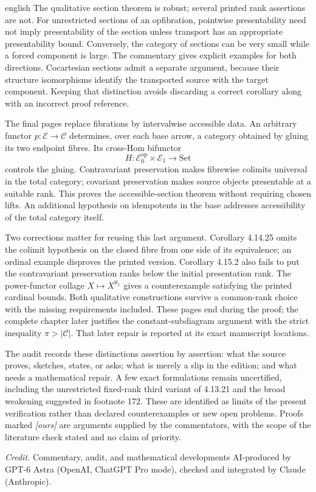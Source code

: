 \begin{otherlanguage*}{english}
The qualitative section theorem is robust; several printed rank assertions are not. For unrestricted sections of an opfibration, pointwise presentability need not imply presentability of the section unless transport has an appropriate presentability bound. Conversely, the category of sections can be very small while a forced component is large. The commentary gives explicit examples for both directions. Cocartesian sections admit a separate argument, because their structure isomorphisms identify the transported source with the target component. Keeping that distinction avoids discarding a correct corollary along with an incorrect proof reference.

The final pages replace fibrations by intervalwise accessible data. An arbitrary functor $p:\mathcal E\to\mathcal C$ determines, over each base arrow, a category obtained by gluing its two endpoint fibres. Its cross-Hom bifunctor
\[
 H:\mathcal E_0^{\mathrm{op}}\times\mathcal E_1\to\mathrm{Set}
\]
controls the gluing. Contravariant preservation makes fibrewise colimits universal in the total category; covariant preservation makes source objects presentable at a suitable rank. This proves the accessible-section theorem without requiring chosen lifts. An additional hypothesis on idempotents in the base addresses accessibility of the total category itself.

Two corrections matter for reusing this last argument. Corollary 4.14.25 omits the colimit hypothesis on the closed fibre from one side of its equivalence; an ordinal example disproves the printed version. Corollary 4.15.2 also fails to put the contravariant preservation ranks below the initial presentation rank. The power-functor collage $X\mapsto X^{\aleph_1}$ gives a counterexample satisfying the printed cardinal bounds. Both qualitative constructions survive a common-rank choice with the missing requirements included. These pages end during the proof; the complete chapter later justifies the constant-subdiagram argument with the strict inequality $\pi>|\mathcal C|$. That later repair is reported at its exact manuscript locations.

The audit records these distinctions assertion by assertion: what the source proves, sketches, states, or asks; what is merely a slip in the edition; and what needs a mathematical repair. A few exact formulations remain uncertified, including the unrestricted fixed-rank third variant of 4.13.21 and the broad weakening suggested in footnote 172. These are identified as limits of the present verification rather than declared counterexamples or new open problems. Proofs marked \emph{[ours]} are arguments supplied by the commentators, with the scope of the literature check stated and no claim of priority.

\medskip
\noindent\textit{Credit.} Commentary, audit, and mathematical developments AI-produced by GPT-6 Astra (OpenAI, ChatGPT Pro mode), checked and integrated by Claude (Anthropic).
\end{otherlanguage*}
